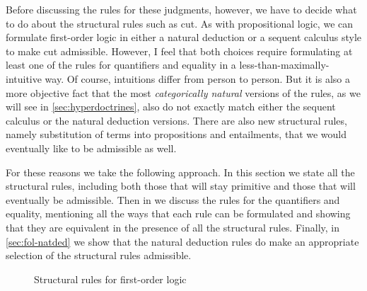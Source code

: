 Before discussing the rules for these judgments, however, we have to decide what to do about the structural rules such as cut.
As with propositional logic, we can formulate first-order logic in either a natural deduction or a sequent calculus style to make cut admissible.
However, I feel that both choices require formulating at least one of the rules for quantifiers and equality in a less-than-maximally-intuitive way.
Of course, intuitions differ from person to person.
But it is also a more objective fact that the most \emph{categorically natural} versions of the rules, as we will see in \cref{sec:hyperdoctrines}, also do not exactly match either the sequent calculus or the natural deduction versions.
There are also new structural rules, namely substitution of terms into propositions and entailments, that we would eventually like to be admissible as well.

For these reasons we take the following approach.
In this section we state all the structural rules, including both those that will stay primitive and those that will eventually be admissible.
Then in  we discuss the rules for the quantifiers and equality, mentioning all the ways that each rule can be formulated and showing that they are equivalent in the presence of all the structural rules.
Finally, in \cref{sec:fol-natded} we show that the natural deduction rules do make an appropriate selection of the structural rules admissible.

\begin{figure}
  \centering
  \caption{Structural rules for first-order logic}
  \label{fig:fol-struc}
\end{figure}

